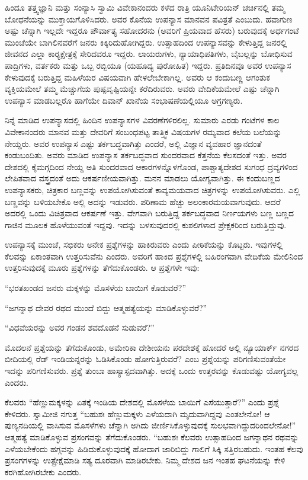  ಹಿಂದೂ ತತ್ತ್ವಜ್ಞಾನಿ ಮತ್ತು ಸಂನ್ಯಾಸಿ ಸ್ವಾಮಿ ವಿವೇಕಾನಂದರು ಕಳೆದ ರಾತ್ರಿ ಯೂನಿಟೇರಿಯನ್ ಚರ್ಚಿನಲ್ಲಿ ತಮ್ಮ ಬೋಧನೆಯನ್ನು ಮುಕ್ತಾಯಗೊಳಿಸಿದರು. ಅವರ ಕೊನೆಯ ಉಪನ್ಯಾಸ ಮಾನವನ ಪವಿತ್ರತೆ ಎಂಬುದು. ಹವಾಗುಣ ಅಷ್ಟು ಚೆನ್ನಾಗಿ ಇಲ್ಲದೇ ಇದ್ದರೂ ಪೌರ್ವಾತ್ಯ ಸಹೋದರನು (ಅವರಿಗೆ ಪ್ರಿಯವಾದ ಹೆಸರು) ಬರುವುದಕ್ಕೆ ಅರ್ಧಗಂಟೆ ಮುಂಚೆಯೇ ಬಾಗಿಲಿನವರೆಗೆ ಜನರು ಕಿಕ್ಕಿರಿದುಹೋಗಿದ್ದರು. ಉತ್ಸಾಹದಿಂದ ಉಪನ್ಯಾಸವನ್ನು ಕೇಳುತ್ತಿದ್ದ ಜನರಲ್ಲಿ ಜೀವನದ ಎಲ್ಲಾ ಕಾರ‍್ಯಕ್ಷೇತ್ರಕ್ಕೆ ಸೇರಿದವರೂ ಇದ್ದರು. ಲಾಯರುಗಳು, ನ್ಯಾಯಾಧಿಪತಿಗಳು, ಬೈಬಲ್ಲನ್ನು ಬೋಧಿಸುವ ಪಾದ್ರಿಗಳು, ವರ್ತಕರು ಮತ್ತು ಒಬ್ಬ ರಬ್ಬಿಯೂ (ಯಹೂದ್ಯ ಪುರೋಹಿತ) ಇದ್ದರು. ಪ್ರತಿದಿನವೂ ಅವರ ಉಪನ್ಯಾಸ ಕೇಳುವುದಕ್ಕೆ ಬರುತ್ತಿದ್ದ ಮಹಿಳೆಯರ ವಿಷಯವಾಗಿ ಹೇಳಲೇಬೇಕಾಗಿಲ್ಲ. ಅವರು ಆ ಕಂದುಬಣ್ಣ ಆಗಂತುಕ ವ್ಯಕ್ತಿಯಮೇಲೆ ತಮ್ಮ ಮೆಚ್ಚುಗೆಯ ಪುಷ್ಪವೃಷ್ಟಿಯನ್ನೇ ಕರೆದಿರುವರು. ಅವರು ವೇದಿಕೆಯಮೇಲೆ ಎಷ್ಟು ಚೆನ್ನಾಗಿ ಉಪನ್ಯಾಸ ಮಾಡಬಲ್ಲರೊ ಹಾಗೆಯೇ ದಿವಾನ್ ಖಾನೆಯ ಸಂಭಾಷಣೆಯಲ್ಲಿಯೂ ಅಗ್ರಗಣ್ಯರು. 

 ನಿನ್ನೆ ಮಾಡಿದ ಉಪನ್ಯಾಸದಲ್ಲಿ ಹಿಂದಿನ ಉಪನ್ಯಾಸಗಳ ವಿವರಣೆಗಳಿರಲಿಲ್ಲ. ಸುಮಾರು ಎರಡು ಗಂಟೆಗಳ ಕಾಲ ವಿವೇಕಾನಂದರು ಮಾನವ ಮತ್ತು ದೇವರಿಗೆ ಸಂಬಂಧಪಟ್ಟ ತಾತ್ತ್ವಿಕ ವಿಷಯಗಳ ರಮ್ಯವಾದ ಕಲೆಯ ಬಲೆಯನ್ನು ನೇಯ್ದರು. ಅವರ ಉಪನ್ಯಾಸ ಎಷ್ಟು ತರ್ಕಬದ್ಧವಾಗಿತ್ತು ಎಂದರೆ, ಅಲ್ಲಿ ವಿಜ್ಞಾನ ವ್ಯವಹಾರ ಜ್ಞಾನದಂತೆ ಕಂಡುಬಂದಿತು. ಅವರು ಮಾಡಿದ ಉಪನ್ಯಾಸ ತರ್ಕಬದ್ಧವಾದ ಸುಂದರವಾದ ಕೆತ್ತನೆಯ ಕೆಲಸದಂತೆ ಇತ್ತು. ಅವರ ದೇಶದಲ್ಲಿ ಕೈಮಗ್ಗದಿಂದ ನೇಯ್ದ ಅತಿ ಸುಂದರವಾದ ಆಕಾರಗಳನ್ನೊಳಗೊಂಡ, ಪಾಶ್ಚಾತ್ಯದೇಶದ ಸುಗಂಧ ದ್ರವ್ಯಗಳಿಂದ ಲೇಪಿತವಾದ ವಸ್ತ್ರದಂತೆ ಅದು ಆಕರ್ಷಣೀಯವಾಗಿತ್ತು. ಮನನ ಮಾಡಲು ಯೋಗ್ಯವಾಗಿತ್ತು. ಈ ಕಂದುಬಣ್ಣದ ಉಪನ್ಯಾಸಕರು, ಚಿತ್ರಕಾರ ಬಣ್ಣವನ್ನು ಉಪಯೋಗಿಸುವಂತೆ ಕಾವ್ಯಮಯವಾದ ಚಿತ್ರಗಳನ್ನು ಉಪಯೋಗಿಸುವರು. ಎಲ್ಲಿ ಬಣ್ಣವನ್ನು ಬಳಿಯಬೇಕೊ ಅಲ್ಲಿ ಅದನ್ನು ಇಡುವರು. ಪರಿಣಾಮ ಹೆಚ್ಚು ಅಲಂಕಾರಮಯವಾಗುವುದು. ಆದರೆ ಅದರಲ್ಲಿ ಒಂದು ವಿಚಿತ್ರವಾದ ಆಕರ್ಷಣೆ ಇತ್ತು. ವೇಗವಾಗಿ ಬರುತ್ತಿದ್ದ ತರ್ಕಬದ್ಧವಾದ ನಿರ್ಣಯಗಳು ಬಣ್ಣ ಬಣ್ಣದ ಗಾಜಿನ ಮೂಲಕ ಹೊಳೆಯುವಂತೆ ಇದ್ದವು. ಇದನ್ನು ಬಳಸುವುದರಲ್ಲಿ ಕುಶಲಿಗಳಾದ ಪ್ರೇಕ್ಷಕರಿಂದ ಬರುತ್ತಿದ್ದುವು. 

 ಉಪನ್ಯಾಸಕ್ಕೆ ಮುಂಚೆ, ಸಭಿಕರು ಅನೇಕ ಪ್ರಶ್ನೆಗಳನ್ನು ಹಾಕಿರುವರು ಎಂದು ಪೀಠಿಕೆಯನ್ನು ಕೊಟ್ಟರು. ಇವುಗಳಲ್ಲಿ ಕೆಲವನ್ನು ಏಕಾಂತವಾಗಿ ಉತ್ತರಿಸುವೆನು ಎಂದರು. ಅವರಿಗೆ ಹಾಕಿದ ಪ್ರಶ್ನೆಗಳಲ್ಲಿ ಬಹಿರಂಗವಾಗಿ ವೇದಿಕೆಯ ಮೇಲಿನಿಂದ ಉತ್ತರಿಸುವುದಕ್ಕೆ ಮೂರು ಪ್ರಶ್ನೆಗಳನ್ನು ತೆಗೆದುಕೊಂಡರು. ಆ ಪ್ರಶ್ನೆಗಳೇ ಇವು: 

 “ಭರತಖಂಡದ ಜನರು ಮಕ್ಕಳನ್ನು ಮೊಸಳೆಯ ಬಾಯಿಗೆ ಕೊಡುವರೆ?” 

 “ಜಗನ್ನಾಥ ದೇವರ ರಥದ ಮುಂದೆ ಬಿದ್ದು ಆತ್ಮಹತ್ಯೆಯನ್ನು ಮಾಡಿಕೊಳ್ಳುವರೆ?” 

 “ವಿಧವೆಯರನ್ನು ಅವರ ಗಂಡನ ಶವದೊಡನೆ ಸುಡುವರೆ?” 

 ಮೊದಲನೆ ಪ್ರಶ್ನೆಯನ್ನು ತೆಗೆದುಕೊಂಡು, ಅಮೇರಿಕಾ ದೇಶೀಯನು ಪರದೇಶಕ್ಕೆ ಹೋದರೆ ಅಲ್ಲಿ ನ್ಯೂಯಾರ್ಕ್ ನಗರದ ಬೀದಿಯಲ್ಲಿ ರೆಡ್ ಇಂಡಿಯನ್ನರನ್ನು ಓಡಿಸಿಕೊಂಡು ಹೋಗುತ್ತಿರುವರೆ? ಎಂಬ ಪ್ರಶ್ನೆಯನ್ನು ಪರಿಗಣಿಸುವಂತೆಯೇ ಇದನ್ನು ಪರಿಗಣಿಸುವರು. ಪ್ರಶ್ನೆ ತುಂಬಾ ಹಾಸ್ಯಾಸ್ಪದವಾಗಿತ್ತು. ಅದಕ್ಕೆ ಒಂದು ಉತ್ತರವನ್ನು ಕೊಡುವಷ್ಟು ಯೋಗ್ಯವಲ್ಲ ಎಂದರು. 

 ಕೆಲವರು “ಹೆಣ್ಣುಮಕ್ಕಳನ್ನು ಏತಕ್ಕೆ ಇಂಡಿಯ ದೇಶದಲ್ಲಿ ಮೊಸಳೆಯ ಬಾಯಿಗೆ ಎಸೆಯುತ್ತಾರೆ?” ಎಂದು ಪ್ರಶ್ನೆ ಕೇಳಿದರು. ಸ್ವಾಮೀಜಿ ನಗುತ್ತ “ಬಹುಶಃ ಹೆಣ್ಣುಮಕ್ಕಳು ಎಳೆಯದಾಗಿ ಮೃದುವಾಗಿದ್ದವು ಎಂತಲೇನೋ! ಆ ಪುಣ್ಯನದಿಯಲ್ಲಿ ವಾಸಿಸುವ ಮೊಸಳೆಗಳು ಚೆನ್ನಾಗಿ ಅಗಿದು ಜೀರ್ಣಿಸಿಕೊಳ್ಳುವುದಕ್ಕೆ ಸುಲಭವಾಗಿದ್ದುದರಿಂದಲೇನೋ!” ಆತ್ಮಹತ್ಯೆ ಮಾಡಿಕೊಳ್ಳುವ ಪ್ರಸಂಗವನ್ನು ತೆಗೆದುಕೊಂಡರು. “ಬಹುಶಃ ಕೆಲವರು ಉತ್ಸಾಹದಿಂದ ಜಗನ್ನಾಥನ ರಥವನ್ನು ಎಳೆಯಬೇಕೆಂದು ಹಗ್ಗವನ್ನು ಹಿಡಿದುಕೊಳ್ಳುವುದಕ್ಕೆ ಹೋದಾಗ ಜಾರಿಬಿದ್ದು ಗಾಲಿಗೆ ಸಿಕ್ಕಿ ಸತ್ತಿರಬಹುದು. ಇಂತಹ ಕೆಲವು ಪ್ರಸಂಗಗಳನ್ನು ಉತ್ಪ್ರೇಕ್ಷೆಮಾಡಿ ಸತ್ಯ ದೂರವಾಗಿ ಮಾಡಿರಬೇಕು. ನಿಮ್ಮ ದೇಶದ ಜನ ಇಂತಹ ಘಟನೆಯನ್ನು ಕೇಳಿ ಕರಗಿಹೋಗಿರಬೇಕು ಎಂದರು. 

